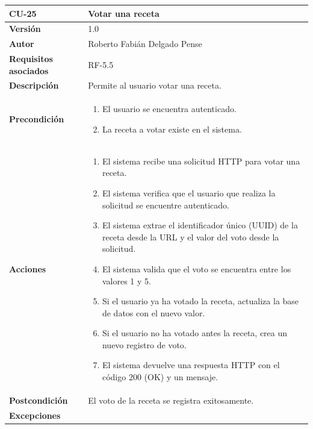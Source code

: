 \begin{table}[p]
	\centering
	\begin{tabularx}{\linewidth}{ p{} p{} }
		\toprule
		\textbf{CU-25}    & \textbf{Votar una receta}\\
		\toprule
		\textbf{Versión}              & 1.0    \\
		\textbf{Autor}                & Roberto Fabián Delgado Pense \\
		\textbf{Requisitos asociados} & RF-5.5 \\ 
		\textbf{Descripción}          & Permite al usuario votar una receta. \\
		\textbf{Precondición}         & 
  		\begin{enumerate}
			\def\labelenumi{\arabic{enumi}.}
			\tightlist
			\item El usuario se encuentra autenticado.
                \item La receta a votar existe en el sistema.
            \end{enumerate}\\
		\textbf{Acciones}             &
		\begin{enumerate}
			\def\labelenumi{\arabic{enumi}.}
			\tightlist
			\item El sistema recibe una solicitud HTTP para votar una receta.
                \item El sistema verifica que el usuario que realiza la solicitud se encuentre autenticado.
			\item El sistema extrae el identificador único (UUID) de la receta desde la URL y el valor del voto              desde la solicitud.
         	\item El sistema valida que el voto se encuentra entre los valores 1 y 5.
                \item Si el usuario ya ha votado la receta, actualiza la base de datos con el nuevo valor.
                \item Si el usuario no ha votado antes la receta, crea un nuevo registro de voto.
                \item El sistema devuelve una respuesta HTTP con el código 200 (OK) y un mensaje.
            \end{enumerate}\\
		\textbf{Postcondición}        & El voto de la receta se registra exitosamente.\\
		\textbf{Excepciones}          & 
            \begin{enumerate}

\end{enumerate}
\end{tabularx}
\end{table}
